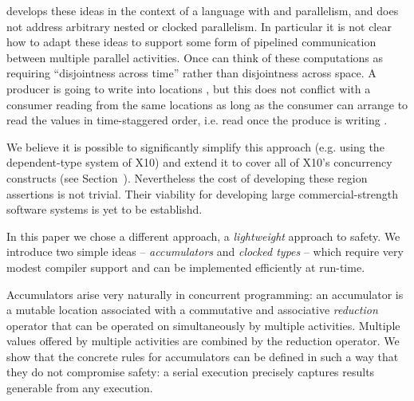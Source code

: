 \cite{DPJ} develops these ideas in the context of a language with
 and  parallelism, and does not
address arbitrary nested or clocked parallelism.  In particular it is
not clear how to adapt these ideas to support some form of pipelined
communication between multiple parallel activities. Once can think of
these computations as requiring ``disjointness across time'' rather
than disjointness across space. A producer is going to write into
locations , but this does not
conflict with a consumer reading from the same locations as long as
the consumer can arrange to read the values in time-staggered order,
i.e. read  once the produce is writing .  

We believe it is possible to significantly simplify this approach
(e.g.{} using the dependent-type system of X10) and extend it to cover
all of X10's concurrency constructs (see
Section~). Nevertheless the cost of developing these
region assertions is not trivial. Their viability for developing large
commercial-strength software systems is yet to be establishd.

In this paper we chose a different approach, a {\em lightweight}
approach to safety. We introduce two simple ideas -- {\em
  accumulators} and {\em clocked types} -- which require very modest
compiler support and can be implemented efficiently at run-time.

Accumulators arise very naturally in concurrent programming: an
accumulator is a mutable location associated with a commutative and
associative {\em reduction} operator that can be operated on
simultaneously by multiple activities. Multiple values offered by
multiple activities are combined by the reduction operator. We show
that the concrete rules for accumulators can be defined in such a way
that they do not compromise safety: a serial execution precisely
captures results generable from any execution.

